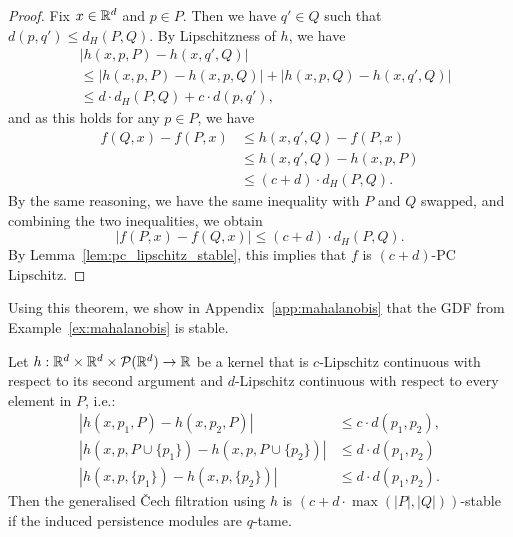 \begin{proof}
    Fix $x \in \mathbb{R}^d$ and $p \in P$. Then we have $q' \in Q$ such that $d(p, q')
    \leq d_H(P, Q)$. By Lipschitzness of $h$, we have
    \begin{align}
        & |h(x, p, P) - h(x, q', Q)| \\
        & \leq |h(x, p, P) - h(x, p, Q)| + |h(x, p, Q) - h(x, q', Q)| \\
        & \leq d \cdot d_H(P, Q) + c \cdot d(p, q'),
    \end{align}
    and as this holds for any $p \in P$, we have
    \begin{align}
        f(Q, x) - f(P, x) & \leq h(x, q', Q) - f(P, x) \\
        & \leq h(x, q', Q) - h(x, p, P) \\
        & \leq (c + d) \cdot d_H(P, Q).
    \end{align}
    By the same reasoning, we have the same inequality with $P$ and $Q$ swapped,
    and combining the two inequalities, we obtain
    \begin{equation}
        |f(P, x) - f(Q, x)| \leq (c + d) \cdot d_H(P, Q).
    \end{equation}
    By Lemma~\ref{lem:pc_lipschitz_stable}, this implies that $f$ is
    $(c + d)$-PC Lipschitz.
\end{proof}
Using this theorem, we show in Appendix~\ref{app:mahalanobis} that the GDF from
Example~\ref{ex:mahalanobis} is stable.
\begin{theorem}
    Let $h : \mathbb{R}^d \times \mathbb{R}^d \times \mathcal{P}(\mathbb{R}^d) \to \mathbb{R}$ be a kernel that
    is $c$-Lipschitz continuous with respect to its second argument and
    $d$-Lipschitz continuous with respect to every element in $P$, i.e.:
    \begin{align}
        |h(x, p_1, P) - h(x, p_2, P)| & \leq c \cdot d(p_1, p_2), \\
        |h(x, p, P \cup \{p_1\}) - h(x, p, P \cup \{p_2\})| & \leq d \cdot d(p_1, p_2) \\
        |h(x, p, \{p_1\}) - h(x, p, \{p_2\})| & \leq d \cdot d(p_1, p_2). 
    \end{align}
    Then the
    generalised \v{C}ech filtration using $h$ is
    $(c + d \cdot \max(|P|, |Q|))$-stable if the induced persistence modules are
    $q$-tame.
\end{theorem}
